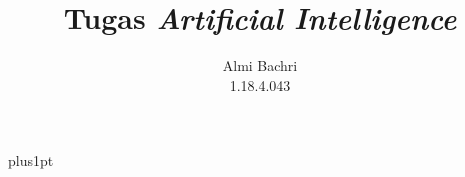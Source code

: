 \documentclass[12pt]{ociamthesis}  %
\title{ Tugas \textit{Artificial Intelligence}\\
}   %
\author{Almi Bachri \\
1.18.4.043}             %
\begin{document}
\baselineskip=18pt plus1pt

\setcounter{secnumdepth}{3}
\setcounter{tocdepth}{3}


\maketitle                  %

\begin{romanpages}          %
\tableofcontents            %
\end{romanpages}            %



\end{document}

